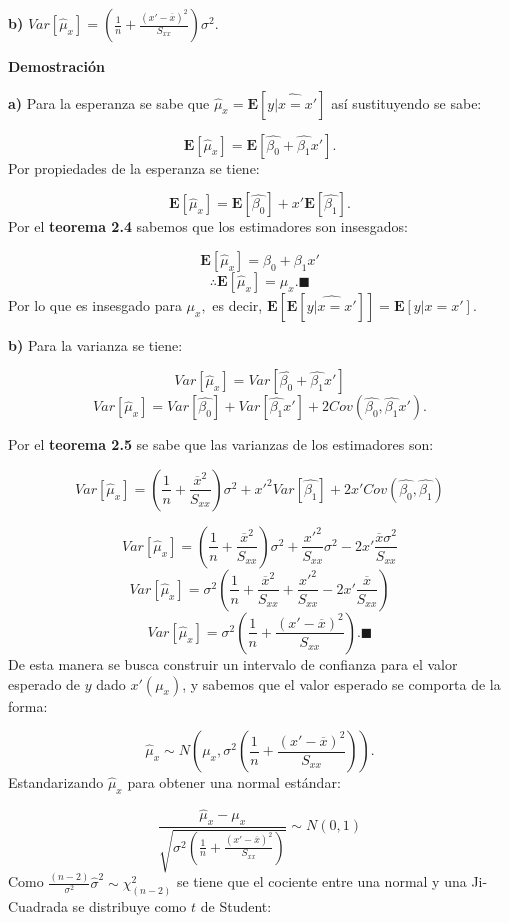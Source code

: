 \documentclass[
  a4paper,
  oneside,
  openany]{book}
\begin{document}
\textbf{b)} \(Var[\hat{\mu}_{x}]=\left(\frac{1}{n}+\frac{(x'-\overline{x})^2}{S_{xx}}\right)\sigma^2.\)

\textbf{Demostración}

\textbf{a)} Para la esperanza se sabe que \(\hat{\mu}_{x}=\mathbf{E}[\widehat{y|x=x'}]\) así sustituyendo se sabe:

\[\mathbf{E}[\hat{\mu}_{x}]=\mathbf{E}\left[\hat{\beta_{0}}+\hat{\beta_{1}}x' \right].\]
Por propiedades de la esperanza se tiene:

\[\mathbf{E}[\hat{\mu}_{x}]=\mathbf{E}\left[\hat{\beta_{0}}\right]+x'\mathbf{E}\left[\hat{\beta_{1}} \right].\]
Por el \textbf{teorema 2.4} sabemos que los estimadores son insesgados:

\[\mathbf{E}[\hat{\mu}_{x}]=\beta_{0}+\beta_{1}x'\]
\[\therefore \mathbf{E}[\hat{\mu}_{x}]=\mu_{x}. \blacksquare\]
Por lo que es insesgado para \(\mu_{x},\) es decir, \(\mathbf{E}\left[\mathbf{E}[\widehat{y|x=x'}] \right]=\mathbf{E}[y|x=x'].\)

\textbf{b)} Para la varianza se tiene:

\[Var[\hat{\mu}_{x}]=Var\left[\hat{\beta_{0}}+\hat{\beta_{1}}x'\right]\]
\[Var[\hat{\mu}_{x}]=Var[\hat{\beta_{0}}]+Var[\hat{\beta_{1}}x']+2Cov(\hat{\beta_{0}},\hat{\beta_{1}}x').\]

Por el \textbf{teorema 2.5} se sabe que las varianzas de los estimadores son:

\[Var[\hat{\mu}_{x}]=\left( \frac{1}{n}+\frac{\overline{x}^2}{S_{xx}}\right)\sigma^2+x'^2Var[\hat{\beta_{1}}]+2x'Cov(\hat{\beta_{0}},\hat{\beta_{1}})\]

\[Var[\hat{\mu}_{x}]=\left( \frac{1}{n}+\frac{\overline{x}^2}{S_{xx}}\right)\sigma^2+\frac{x'^2}{S_{xx}}\sigma^2-2x'\frac{\overline{x}\sigma^2}{S_{xx}}\]
\[Var[\hat{\mu}_{x}]=\sigma^2\left( \frac{1}{n}+\frac{\overline{x}^2}{S_{xx}}+\frac{x'^2}{S_{xx}}-2x'\frac{\overline{x}}{S_{xx}}\right)\]
\[Var[\hat{\mu}_{x}]=\sigma^2\left( \frac{1}{n}+\frac{(x'-\overline{x})^2}{S_{xx}}\right). \blacksquare\]
De esta manera se busca construir un intervalo de confianza para el valor esperado de \(y\) dado \(x'(\mu_{x})\), y sabemos que el valor esperado se comporta de la forma:

\[\hat{\mu}_{x}\sim N\left(\mu_{x},\sigma^2\left( \frac{1}{n}+\frac{(x'-\overline{x})^2}{S_{xx}}\right)\right).\]
Estandarizando \(\hat{\mu}_{x}\) para obtener una normal estándar:

\[\frac{\hat{\mu}_{x}-\mu_{x}}{\sqrt{\sigma^2\left( \frac{1}{n}+\frac{(x'-\overline{x})^2}{S_{xx}}\right)}}\sim N(0,1)\]
Como \(\frac{(n-2)}{\sigma^2}\hat{\sigma}^2\sim\chi^2_{(n-2)}\) se tiene que el cociente entre una normal y una Ji-Cuadrada se distribuye como \(t\) de Student:
\end{document}
